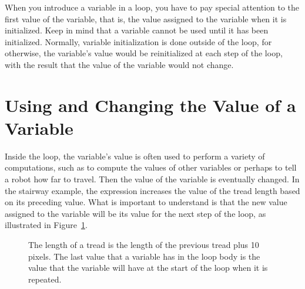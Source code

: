 \documentclass[a4paper,10pt,twoside]{book}
\begin{document}
When you introduce a variable in a loop, you have to pay special attention to the first value of 
the variable, that is, the value assigned to the variable when it is initialized. Keep in mind that 
a variable cannot be used until it has been initialized. Normally, variable initialization is done 
outside of the loop, for otherwise, the variable’s value would be reinitialized at each step of the 
loop, with the result that the value of the variable would not change. 

\section{Using and Changing the Value of a Variable}

Inside the loop, the variable’s value is often used to perform a variety of computations, such as to compute the values of other variables or perhaps to tell a robot how far to travel. Then the value of the variable is eventually changed. In the stairway example, the expression  increases the value of the tread length based on its preceding value. What is important to understand is that the new value assigned to the variable will be its value for the next step of the loop, as illustrated in Figure~\ref{fig:steppingLoop}. 

\begin{figure}
\caption{The length of a tread is the length of the previous tread plus 10 pixels. The last value that a variable has in the loop body is the value that the variable will have at the start of the loop when it is repeated.\label{fig:steppingLoop}}
\end{figure}
\end{document}
